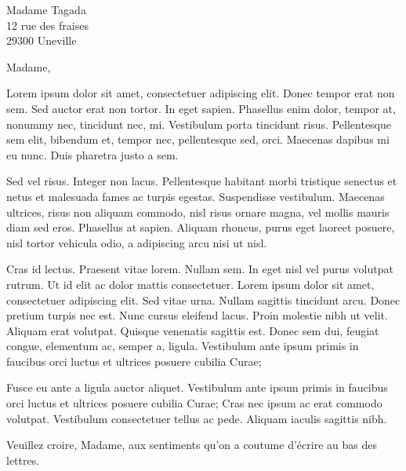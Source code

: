 \documentclass[11pt,origdate]{lettre}
\begin{document}
\begin{letter}{Madame Tagada\\ %
		           12 rue des fraises\\
		           29300 Uneville}
		\opening{Madame,}
		Lorem ipsum dolor sit amet, consectetuer adipiscing elit. Donec tempor
		erat non sem. Sed auctor erat non tortor. In eget sapien. Phasellus
		enim dolor, tempor at, nonummy nec, tincidunt nec, mi. Vestibulum
		porta tincidunt risus. Pellentesque sem elit, bibendum et, tempor
		nec, pellentesque sed, orci. Maecenas dapibus mi eu nunc. Duis pharetra
		justo a sem.

		Sed vel risus. Integer non lacus. Pellentesque habitant morbi tristique
		senectus et netus et malesuada fames ac turpis egestas. Suspendisse
		vestibulum. Maecenas ultrices, risus non aliquam commodo, nisl risus
		ornare magna, vel mollis mauris diam sed eros. Phasellus at sapien.
		Aliquam rhoncus, purus eget laoreet posuere, nisl tortor vehicula
		odio, a adipiscing arcu nisi ut nisl.

		Cras id lectus. Praesent vitae lorem. Nullam sem. In eget nisl vel
		purus volutpat rutrum. Ut id elit ac dolor mattis consectetuer. Lorem
		ipsum dolor sit amet, consectetuer adipiscing elit. Sed vitae urna.
		Nullam sagittis tincidunt arcu. Donec pretium turpis nec est. Nunc
		cursus eleifend lacus. Proin molestie nibh ut velit. Aliquam erat
		volutpat. Quisque venenatis sagittis est. Donec sem dui, feugiat congue,
		elementum ac, semper a, ligula. Vestibulum ante ipsum primis in faucibus
		orci luctus et ultrices posuere cubilia Curae;

		Fusce eu ante a ligula auctor aliquet. Vestibulum ante ipsum primis
		in faucibus orci luctus et ultrices posuere cubilia Curae; Cras nec
		ipsum ac erat commodo volutpat. Vestibulum consectetuer tellus ac
		pede. Aliquam iaculis sagittis nibh.
		\closing{Veuillez croire, Madame, aux sentiments qu'on a coutume d'écrire au bas des lettres.}
		
	\end{letter}
\end{document}
